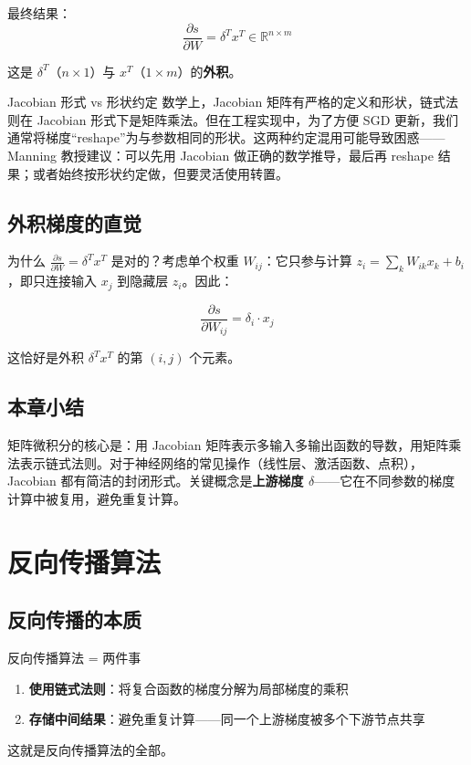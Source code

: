 \documentclass[a4paper]{article}
\begin{document}
最终结果：
$$\frac{\partial s}{\partial W} = \delta^T x^T \in \mathbb{R}^{n \times m}$$

这是 $\delta^T$（$n \times 1$）与 $x^T$（$1 \times m$）的\textbf{外积}。

\begin{warningbox}{Jacobian 形式 vs 形状约定}
数学上，Jacobian 矩阵有严格的定义和形状，链式法则在 Jacobian 形式下是矩阵乘法。但在工程实现中，为了方便 SGD 更新，我们通常将梯度``reshape''为与参数相同的形状。这两种约定混用可能导致困惑——Manning 教授建议：可以先用 Jacobian 做正确的数学推导，最后再 reshape 结果；或者始终按形状约定做，但要灵活使用转置。
\end{warningbox}





\subsection{外积梯度的直觉}

为什么 $\frac{\partial s}{\partial W} = \delta^T x^T$ 是对的？考虑单个权重 $W_{ij}$：它只参与计算 $z_i = \sum_k W_{ik} x_k + b_i$，即只连接输入 $x_j$ 到隐藏层 $z_i$。因此：

$$\frac{\partial s}{\partial W_{ij}} = \delta_i \cdot x_j$$

这恰好是外积 $\delta^T x^T$ 的第 $(i,j)$ 个元素。

\subsection{本章小结}

矩阵微积分的核心是：用 Jacobian 矩阵表示多输入多输出函数的导数，用矩阵乘法表示链式法则。对于神经网络的常见操作（线性层、激活函数、点积），Jacobian 都有简洁的封闭形式。关键概念是\textbf{上游梯度 $\delta$}——它在不同参数的梯度计算中被复用，避免重复计算。


\section{反向传播算法}

\subsection{反向传播的本质}

\begin{importantbox}{反向传播算法 = 两件事}
\begin{enumerate}
    \item \textbf{使用链式法则}：将复合函数的梯度分解为局部梯度的乘积
    \item \textbf{存储中间结果}：避免重复计算——同一个上游梯度被多个下游节点共享
\end{enumerate}
这就是反向传播算法的全部。
\end{importantbox}
\end{document}
